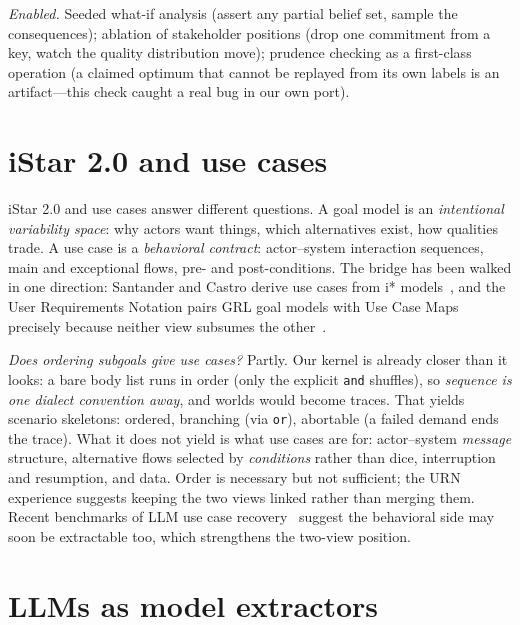 \documentclass[sigconf,nonacm]{acmart}
\begin{document}
\emph{Enabled.} Seeded what-if analysis (assert any partial
belief set, sample the consequences); ablation of stakeholder
positions (drop one commitment from a key, watch the quality
distribution move); prudence checking as a first-class
operation (a claimed optimum that cannot be replayed from its
own labels is an artifact---this check caught a real bug in
our own port).

\section{iStar 2.0 and use cases}

iStar 2.0 and use cases answer different questions. A goal
model is an \emph{intentional variability space}: why actors
want things, which alternatives exist, how qualities trade.
A use case is a \emph{behavioral contract}: actor--system
interaction sequences, main and exceptional flows, pre- and
post-conditions. The bridge has been walked in one direction:
Santander and Castro derive use cases from i*
models~\cite{santander02}, and the User Requirements Notation
pairs GRL goal models with Use Case Maps precisely because
neither view subsumes the other~\cite{amyot10}.

\emph{Does ordering subgoals give use cases?} Partly. Our
kernel is already closer than it looks: a bare body list runs
in order (only the explicit \verb|and| shuffles), so
\emph{sequence is one dialect convention away}, and worlds
would become traces. That yields scenario skeletons: ordered,
branching (via \verb|or|), abortable (a failed demand ends the
trace). What it does not yield is what use cases are for:
actor--system \emph{message} structure, alternative flows
selected by \emph{conditions} rather than dice, interruption
and resumption, and data. Order is necessary but not
sufficient; the URN experience suggests keeping the two views
linked rather than merging them. Recent benchmarks of LLM use
case recovery~\cite{ucrbench25} suggest the behavioral side may
soon be extractable too, which strengthens the two-view
position.

\section{LLMs as model extractors}
\end{document}
